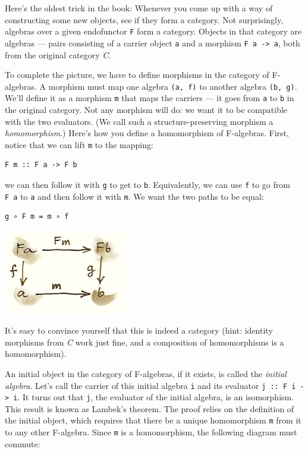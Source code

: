 Here's the oldest trick in the book: Whenever you come up with a way of
constructing some new objects, see if they form a category. Not
surprisingly, algebras over a given endofunctor \texttt{F} form a
category. Objects in that category are algebras --- pairs consisting of
a carrier object \texttt{a} and a morphism
\texttt{F\ a\ -\textgreater{}\ a}, both from the original category
\emph{C}.

To complete the picture, we have to define morphisms in the category of
F-algebras. A morphism must map one algebra \texttt{(a,\ f)} to another
algebra \texttt{(b,\ g)}. We'll define it as a morphism \texttt{m} that
maps the carriers --- it goes from \texttt{a} to \texttt{b} in the
original category. Not any morphism will do: we want it to be compatible
with the two evaluators. (We call such a structure-preserving morphism a
\emph{homomorphism}.) Here's how you define a homomorphism of
F-algebras. First, notice that we can lift \texttt{m} to the mapping:

\begin{verbatim}
F m :: F a -> F b
\end{verbatim}

we can then follow it with \texttt{g} to get to \texttt{b}.
Equivalently, we can use \texttt{f} to go from \texttt{F\ a} to
\texttt{a} and then follow it with \texttt{m}. We want the two paths to
be equal:

\begin{verbatim}
g ∘ F m = m ∘ f
\end{verbatim}

\includegraphics[width=2.09375in]{images/alg.png}

It's easy to convince yourself that this is indeed a category (hint:
identity morphisms from \emph{C} work just fine, and a composition of
homomorphisms is a homomorphism).

An initial object in the category of F-algebras, if it exists, is called
the \emph{initial algebra}. Let's call the carrier of this initial
algebra \texttt{i} and its evaluator
\texttt{j\ ::\ F\ i\ -\textgreater{}\ i}. It turns out that \texttt{j},
the evaluator of the initial algebra, is an isomorphism. This result is
known as Lambek's theorem. The proof relies on the definition of the
initial object, which requires that there be a unique homomorphism
\texttt{m} from it to any other F-algebra. Since \texttt{m} is a
homomorphism, the following diagram must commute:

